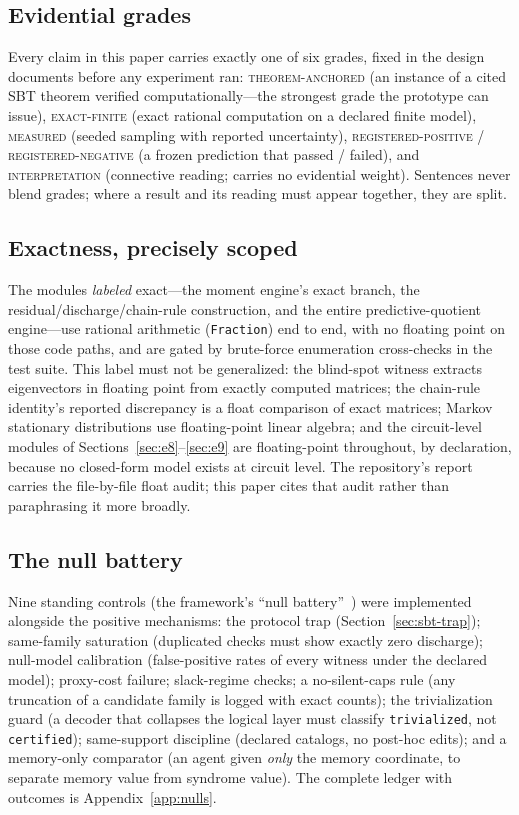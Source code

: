 \documentclass[11pt]{article}
\newcommand{\grade}[1]{\textsc{#1}}
\newcommand{\gTheorem}{\grade{theorem-anchored}}
\newcommand{\gExact}{\grade{exact-finite}}
\newcommand{\gMeasured}{\grade{measured}}
\newcommand{\gRegPos}{\grade{registered-positive}}
\newcommand{\gRegNeg}{\grade{registered-negative}}
\newcommand{\gInterp}{\grade{interpretation}}
\theoremstyle{definition}
\begin{document}
\subsection{Evidential grades}
\label{sec:methods-grades}

Every claim in this paper carries exactly one of six grades, fixed in the design documents before any experiment ran: \gTheorem{} (an instance of a cited SBT theorem verified computationally---the strongest grade the prototype can issue), \gExact{} (exact rational computation on a declared finite model), \gMeasured{} (seeded sampling with reported uncertainty), \gRegPos{} / \gRegNeg{} (a frozen prediction that passed / failed), and \gInterp{} (connective reading; carries no evidential weight). Sentences never blend grades; where a result and its reading must appear together, they are split.

\subsection{Exactness, precisely scoped}
\label{sec:methods-exact}

The modules \emph{labeled} exact---the moment engine's exact branch, the residual/discharge/chain-rule construction, and the entire predictive-quotient engine---use rational arithmetic (\texttt{Fraction}) end to end, with no floating point on those code paths, and are gated by brute-force enumeration cross-checks in the test suite. This label must not be generalized: the blind-spot witness extracts eigenvectors in floating point from exactly computed matrices; the chain-rule identity's reported discrepancy is a float comparison of exact matrices; Markov stationary distributions use floating-point linear algebra; and the circuit-level modules of Sections~\ref{sec:e8}--\ref{sec:e9} are floating-point throughout, by declaration, because no closed-form model exists at circuit level. The repository's report carries the file-by-file float audit; this paper cites that audit rather than paraphrasing it more broadly. 

\subsection{The null battery}
\label{sec:methods-nulls}

Nine standing controls (the framework's ``null battery''~\cite{sbt-ng}) were implemented alongside the positive mechanisms: the protocol trap (Section~\ref{sec:sbt-trap}); same-family saturation (duplicated checks must show exactly zero discharge); null-model calibration (false-positive rates of every witness under the declared model); proxy-cost failure; slack-regime checks; a no-silent-caps rule (any truncation of a candidate family is logged with exact counts); the trivialization guard (a decoder that collapses the logical layer must classify \texttt{trivialized}, not \texttt{certified}); same-support discipline (declared catalogs, no post-hoc edits); and a memory-only comparator (an agent given \emph{only} the memory coordinate, to separate memory value from syndrome value). The complete ledger with outcomes is Appendix~\ref{app:nulls}.
\end{document}
